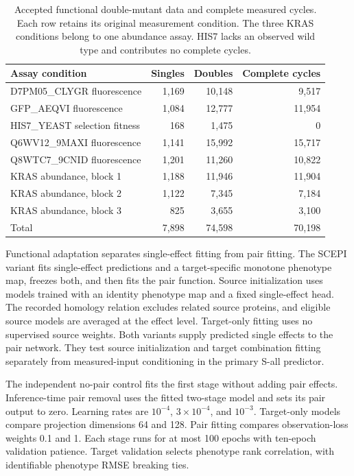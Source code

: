 \documentclass{llncs}
\begin{document}
\begin{table}[H]
\centering
\setlength{\tabcolsep}{5pt}
\caption{Accepted functional double-mutant data and complete measured cycles. Each row retains its original measurement condition. The three KRAS conditions belong to one abundance assay. HIS7 lacks an observed wild type and contributes no complete cycles.}
\label{tab:functionalcoverage}
\begin{tabular}{lrrr}
\toprule
Assay condition & Singles & Doubles & Complete cycles \\
\midrule
D7PM05\_CLYGR fluorescence & 1,169 & 10,148 & 9,517 \\
GFP\_AEQVI fluorescence & 1,084 & 12,777 & 11,954 \\
HIS7\_YEAST selection fitness & 168 & 1,475 & 0 \\
Q6WV12\_9MAXI fluorescence & 1,141 & 15,992 & 15,717 \\
Q8WTC7\_9CNID fluorescence & 1,201 & 11,260 & 10,822 \\
KRAS abundance, block 1 & 1,188 & 11,946 & 11,904 \\
KRAS abundance, block 2 & 1,122 & 7,345 & 7,184 \\
KRAS abundance, block 3 & 825 & 3,655 & 3,100 \\
\midrule
Total & 7,898 & 74,598 & 70,198 \\
\bottomrule
\end{tabular}
\end{table}

Functional adaptation separates single-effect fitting from pair fitting. The SCEPI variant fits single-effect predictions and a target-specific monotone phenotype map, freezes both, and then fits the pair function. Source initialization uses models trained with an identity phenotype map and a fixed single-effect head. The recorded homology relation excludes related source proteins, and eligible source models are averaged at the effect level. Target-only fitting uses no supervised source weights. Both variants supply predicted single effects to the pair network. They test source initialization and target combination fitting separately from measured-input conditioning in the primary S-all predictor.

The independent no-pair control fits the first stage without adding pair effects. Inference-time pair removal uses the fitted two-stage model and sets its pair output to zero. Learning rates are $10^{-4}$, $3\times10^{-4}$, and $10^{-3}$. Target-only models compare projection dimensions 64 and 128. Pair fitting compares observation-loss weights 0.1 and 1. Each stage runs for at most 100 epochs with ten-epoch validation patience. Target validation selects phenotype rank correlation, with identifiable phenotype RMSE breaking ties.
\end{document}
